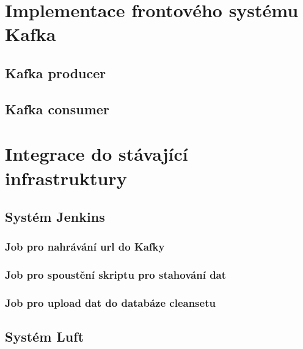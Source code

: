 \documentclass[thesis=M,czech,hidelinks]{FITthesis}[2013/05/06]
\begin{document}
\section{Implementace frontového systému Kafka}




\subsection{Kafka producer}




\subsection{Kafka consumer}





\section{Integrace do stávající infrastruktury} 








\subsection{Systém Jenkins}




\subsubsection{Job pro nahrávání url do Kafky}




\subsubsection{Job pro spoustění skriptu pro stahování dat}




\subsubsection{Job pro upload dat do databáze cleansetu}








\subsection{Systém Luft}
\end{document}
